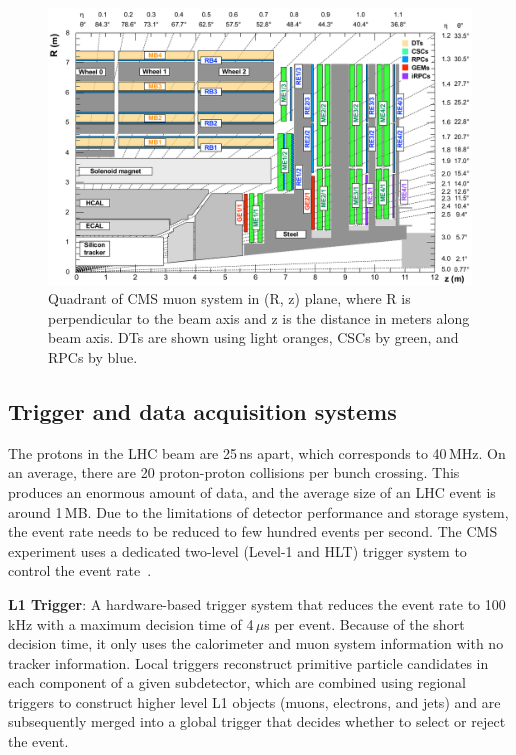 \begin{figure}[h]
\centering
\includegraphics[scale=0.55]{fig/lhc/rpclayout.png}
\caption{\label{fig:rpc_dt} Quadrant of CMS muon system in (R, z) plane, where R is perpendicular to the beam axis and z is the distance in meters along beam axis. DTs are shown using light oranges, CSCs by green, and RPCs by blue.}
\end{figure}

\subsection{Trigger and data acquisition systems}
The protons in the LHC beam are 25\,ns apart, which corresponds to 40\,MHz. On an average, there are 20 proton-proton collisions per bunch crossing. This produces an enormous amount of data, and the average size of an LHC event is around 1\,MB. Due to the limitations of detector performance and storage system, the event rate needs to be reduced to few hundred events per second. The CMS experiment uses a dedicated two-level (Level-1 and HLT) trigger system to control the event rate~\cite{cms_trigger}.

\textbf{L1 Trigger}: A hardware-based trigger system that reduces the event rate to 100\,kHz with a maximum decision time of 4\,$\mu$s per event. Because of the short decision time, it only uses the calorimeter and muon system information with no tracker information. Local triggers reconstruct primitive particle candidates in each component of a given subdetector, which are combined using regional triggers to construct higher level L1 objects (muons, electrons, and jets) and are subsequently merged into a global trigger that decides whether to select or reject the event. 

